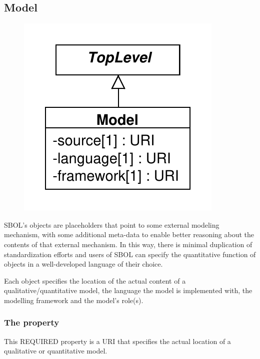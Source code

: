 
\subsection{Model}
\label{sec:Model}

\begin{figure}[ht]
\begin{center}
\includegraphics[scale=0.6]{uml/model}
\caption[]{}
\label{uml:model}
\end{center}
\end{figure}

SBOL's  objects are placeholders that point to some external modeling mechanism, with some additional meta-data to enable better reasoning about the contents of that external mechanism.
In this way, there is minimal duplication of standardization efforts and users of SBOL can specify the quantitative function of  objects in a well-developed language of their choice. 

Each  object specifies the location of the actual content of a qualitative/quantitative model, the language the model is implemented with, the modelling framework and the model's role(s). 

\subsubsection*{ The  property}
This REQUIRED property is a URI that specifies the actual location of a qualitative or quantitative model.

